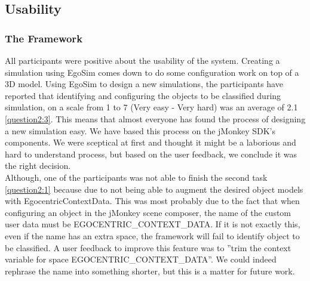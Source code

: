 \subsection{Usability} %
\label{sec:eval_usability}

\subsubsection{The Framework} %
All participants were positive about the usability of the system. Creating a simulation using EgoSim comes down to do some configuration work on top of a 3D model. Using EgoSim to design a new simulations, the participants have reported that identifying and configuring the objects to be classified during simulation, on a scale from 1 to 7 (Very easy - Very hard) was an average of 2.1 \ref{question2:3}. This means that almost everyone has found the process of designing a new simulation easy. We have based this process on the jMonkey SDK's components. We were sceptical at first and thought it might be a laborious and hard to understand process, but based on the user feedback, we conclude it was the right decision.\\

Although, one of the participants was not able to finish the second task \ref{question2:1} because due to not being able to augment the desired object models with EgocentricContextData. This was most probably due to the fact that when configuring an object in the jMonkey scene composer, the name of the custom user data must be EGOCENTRIC\_CONTEXT\_DATA. If it is not exactly this, even if the name has an extra space, the framework will fail to identify object to be classified. A user feedback to improve this feature was to ''trim the context variable for space EGOCENTRIC\_CONTEXT\_DATA''. We could indeed rephrase the name into something shorter, but this is a matter for future work.\\

